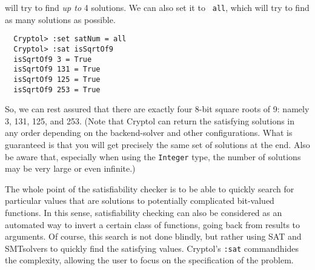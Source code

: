 will try to find \emph{up to} 4 solutions. We can also set it to {\tt
  all}, which will try to find as many solutions as possible.
\begin{Verbatim}
  Cryptol> :set satNum = all
  Cryptol> :sat isSqrtOf9
  isSqrtOf9 3 = True
  isSqrtOf9 131 = True
  isSqrtOf9 125 = True
  isSqrtOf9 253 = True
\end{Verbatim}
So, we can rest assured that there are exactly four 8-bit square
roots of 9: namely 3, 131, 125, and 253. (Note that Cryptol can
return the satisfying solutions in any order depending on the
backend-solver and other configurations. What is guaranteed is that
you will get precisely the same set of solutions at the end. Also be
aware that, especially when using the \texttt{Integer} type, the
number of solutions may be very large or even infinite.)

The whole point of the satisfiability checker is to be able to quickly
search for particular values that are solutions to potentially
complicated bit-valued functions. In this sense, satisfiability
checking can also be considered as an automated way to invert a
certain class of functions, going back from results to arguments. Of
course, this search is not done blindly, but rather using SAT\glosSAT
and SMT\glosSMT solvers to quickly find the satisfying
values. Cryptol's {\tt :sat} command\indCmdSat hides the complexity,
allowing the user to focus on the specification of the problem.


